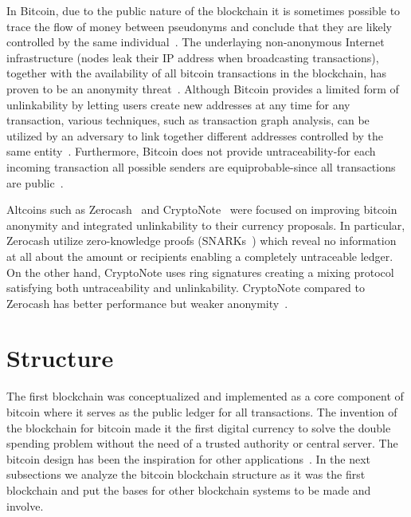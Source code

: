 In Bitcoin, due to the public nature of the blockchain it is sometimes possible to trace the flow of money between pseudonyms and conclude that they are likely controlled by the same
individual~\cite{7163021}. The underlaying non-anonymous Internet infrastructure (nodes leak their IP address when broadcasting transactions),
together with the availability of all bitcoin transactions in the blockchain, has proven to be an anonymity threat~\cite{10.1007/978-3-319-17016-9_1, 7163021,Meiklejohn:2013:FBC:2504730.2504747,6113303,10.1007/978-3-642-39884-1_2,fi5020237}.
Although Bitcoin provides a limited form of unlinkability by letting users create new addresses at any time for any
transaction, various techniques, such as transaction graph analysis, can be utilized by an adversary to link together different addresses controlled
by the same entity~\cite{7163021,Meiklejohn:2013:FBC:2504730.2504747,6113303,10.1007/978-3-642-39884-1_2,fi5020237}.
Furthermore, Bitcoin does not provide untraceability-for each incoming transaction all possible senders are equiprobable-since all transactions are public~\cite{cryptonote}.

Altcoins such as Zerocash~\cite{zcash} and CryptoNote~\cite{cryptonote} were focused on improving bitcoin anonymity and integrated unlinkability to their currency proposals.
In particular, Zerocash utilize zero-knowledge proofs (SNARKs~\cite{10.1007/978-3-642-40084-1_6}) which reveal no information at all about the amount or recipients enabling a completely untraceable ledger.
On the other hand, CryptoNote uses ring signatures creating a mixing protocol satisfying both untraceability and unlinkability. CryptoNote compared to Zerocash has better performance but weaker anonymity~\cite{7163021}.

\section{Structure}\label{blockchain:structure}

The first blockchain was conceptualized and implemented as a core component of bitcoin where it serves as the public ledger for all transactions.
The invention of the blockchain for bitcoin made it the first digital currency to solve the double spending problem without the need of a trusted authority or
central server. The bitcoin design has been the inspiration for other applications~\cite{7163021,10.1007/978-3-662-46803-6_10}. In the next subsections we analyze
the bitcoin blockchain structure as it was the first blockchain and put the bases for other blockchain systems to be made and involve.

